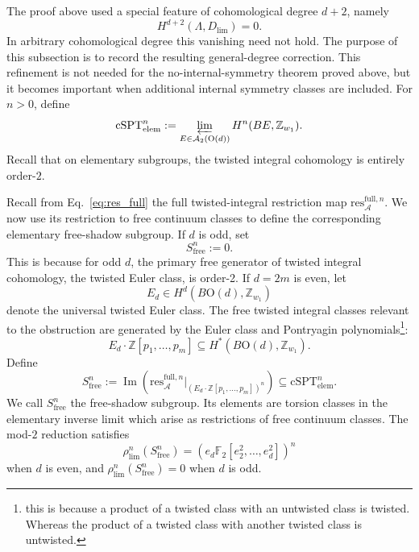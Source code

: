 \documentclass[aps,prx,reprint,superscriptaddress,twocolumn,amsmath,amssymb,amsfonts, nofootinbib]{revtex4-2}
\newcommand{\res}{\text{res}}
\theoremstyle{apsstyle}
\begin{document}
The proof above used a special feature of cohomological degree $d+2$, namely 
\begin{equation} 
H^{d+2}(\Lambda,D_{\lim})=0. 
\end{equation} 
In arbitrary cohomological degree this vanishing need not hold. The purpose of this subsection is to record the resulting general-degree correction. This refinement is not needed for the no-internal-symmetry theorem proved above, but it becomes important when additional internal symmetry classes are included. For $n>0$, define 
\begin{equation} 
\mathrm{cSPT}_{\mathrm{elem}}^n := \varprojlim_{E\in\mathcal A_2(\mathrm{O}(d))} H^n(BE,\mathbb Z_{w_1}). \end{equation} 
Recall that on elementary subgroups, the twisted integral cohomology is entirely order-$2$.

\medskip 

\noindent Recall from Eq.~\eqref{eq:res_full} the full twisted-integral restriction map $\res_{\mathcal A}^{\mathrm{full},n}$. We now use its restriction to free continuum classes to define the corresponding elementary free-shadow subgroup. If $d$ is odd, set 
\begin{equation} 
S_{\mathrm{free}}^n:=0. 
\end{equation}
This is because for odd $d$, the primary free generator of twisted integral cohomology, the twisted Euler class, is order-2. If $d=2m$ is even, let 
\begin{equation*} 
E_d\in H^d(B\mathrm{O}(d),\mathbb Z_{w_1}) 
\end{equation*}
denote the universal twisted Euler class. The free twisted integral classes relevant to the obstruction are generated by the Euler class and Pontryagin polynomials\footnote{this is because a product of a twisted class with an untwisted class is twisted. Whereas the product of a twisted class with another twisted class is untwisted.}: 
\begin{equation} 
E_d\cdot \mathbb Z[p_1,\dots,p_m] \subseteq H^*(B\mathrm{O}(d),\mathbb Z_{w_1}). 
\end{equation} Define 
\begin{equation} 
S_{\mathrm{free}}^n := \operatorname{Im} \left( \res_{\mathcal A}^{\mathrm{full},n} \big|_{\left(E_d\cdot\mathbb Z[p_1,\dots,p_m]\right)^n} \right) \subseteq \mathrm{cSPT}_{\mathrm{elem}}^n . 
\label{eq:Sfree_definition} 
\end{equation} 
We call $S_{\mathrm{free}}^n$ the free-shadow subgroup. Its elements are torsion classes in the elementary inverse limit which arise as restrictions of free continuum classes. The mod-$2$ reduction satisfies 
\begin{equation} 
\rho_{\lim}^n(S_{\mathrm{free}}^n) = \left( e_d\mathbb F_2[e_2^2,\dots,e_d^2] \right)^n \label{eq:Sfree_reduction} 
\end{equation} 
when $d$ is even, and $\rho_{\lim}^n(S_{\mathrm{free}}^n)=0$ when $d$ is odd.
\end{document}
